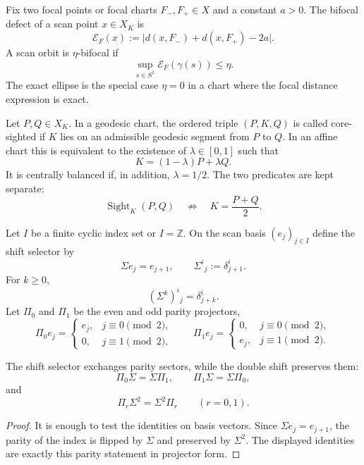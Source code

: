 \begin{definition}
\label{def:bifocal-defect-strict}
Fix two focal points or focal charts $F_-,F_+\in X$ and a constant $a>0$.  The bifocal defect of a scan point $x\in X_K$ is
\[
\mathcal E_F(x)
:=
\bigl|d(x,F_-)+d(x,F_+)-2a\bigr|.
\]
A scan orbit is $\eta$-bifocal if
\[
\sup_{s\in S^1}\mathcal E_F(\gamma(s))\leq \eta .
\]
The exact ellipse is the special case $\eta=0$ in a chart where the focal distance expression is exact.
\end{definition}

\begin{definition}
\label{def:triolic-sight-predicate}
Let $P,Q\in X_K$.  In a geodesic chart, the ordered triple $(P,K,Q)$ is called core-sighted if $K$ lies on an admissible geodesic segment from $P$ to $Q$.  In an affine chart this is equivalent to the existence of $\lambda\in[0,1]$ such that
\[
K=(1-\lambda)P+\lambda Q .
\]
It is centrally balanced if, in addition, $\lambda=1/2$.  The two predicates are kept separate:
\[
\operatorname{Sight}_K(P,Q)
\quad\not\Rightarrow\quad
K=\frac{P+Q}{2}.
\]
\end{definition}

\begin{definition}
\label{def:shift-selector-parity-sectors}
Let $I$ be a finite cyclic index set or $I=\mathbb Z$.  On the scan basis $(e_j)_{j\in I}$ define the shift selector by
\[
\Sigma e_j=e_{j+1},
\qquad
\Sigma^i{}_j:=\delta^i_{j+1}.
\]
For $k\geq0$,
\[
(\Sigma^k)^i{}_j=\delta^i_{j+k}.
\]
Let $\Pi_0$ and $\Pi_1$ be the even and odd parity projectors,
\[
\Pi_0 e_j=\begin{cases}e_j,&j\equiv0\pmod2,\\0,&j\equiv1\pmod2,
\end{cases}
\qquad
\Pi_1 e_j=\begin{cases}0,&j\equiv0\pmod2,\\e_j,&j\equiv1\pmod2.
\end{cases}
\]
\end{definition}

\begin{lemma}
\label{lem:parity-exchange-law}
The shift selector exchanges parity sectors, while the double shift preserves them:
\[
\Pi_0\Sigma=\Sigma\Pi_1,
\qquad
\Pi_1\Sigma=\Sigma\Pi_0,
\]
and
\[
\Pi_r\Sigma^2=\Sigma^2\Pi_r
\qquad(r=0,1).
\]
\end{lemma}

\begin{proof}
It is enough to test the identities on basis vectors.  Since $\Sigma e_j=e_{j+1}$, the parity of the index is flipped by $\Sigma$ and preserved by $\Sigma^2$.  The displayed identities are exactly this parity statement in projector form.
\end{proof}


